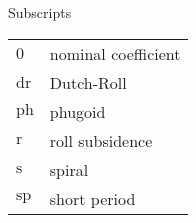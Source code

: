 \noindent
Subscripts
{\renewcommand\arraystretch{1.0}
	\noindent\begin{longtable*}{@{}l @{\quad=\quad} l@{}}
		$0$ & nominal coefficient \\
		$\text{dr}$ & Dutch-Roll \\
		$\text{ph}$ & phugoid \\
		$\text{r}$  & roll subsidence \\
		$\text{s}$  & spiral \\
		$\text{sp}$ & short period 
\end{longtable*}}
\noindent
\begin{comment}
Superscripts
{\renewcommand\arraystretch{1.0}
	\noindent\begin{longtable*}{@{}l @{\quad=\quad} l@{}}
		$\hat{\pbox{1}}$ & normalized variable
\end{longtable*}}
\end{comment}

\begin{comment}
\noindent \textit{Subscript/Superscript}
{\renewcommand\arraystretch{1.0}
\noindent\begin{longtable*}{@{}l @{\quad=\quad} l@{}}
$0$ & nominal coefficient \\
$P$ & coefficient as a function of vehicle roll-rate \\ 
$Q$ & coefficient as a function of vehicle pitch-rate \\ 
$R$ & coefficient as a function of vehicle yaw-rate \\
$\alpha$ & coefficient as a function of angle of attack \\
$\alpha^2$ & coefficient as a function of the square of angle of attack \\
$\beta$ & coefficient as a function of angle of sideslip  \\ 
$\delta_{a}$ & coefficient as a function of aileron deflection angle \\
$\delta_{e}$ & coefficient as a function of elevator deflection angle \\
$\delta_{e}^{2}$ & coefficient as a function of the square of elevator deflection angle \\
$\delta_{r}$ & coefficient as a function of rudder deflection angle \\
$\dot{}$ & variable derivative with respect to time
\end{longtable*}}
\end{comment}